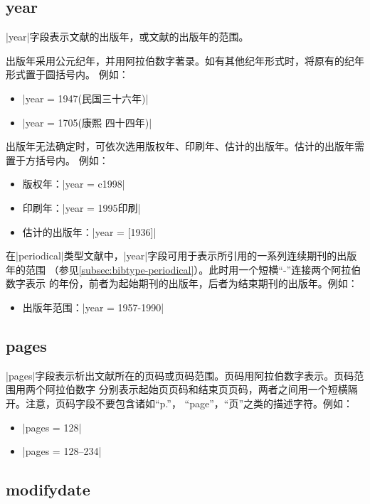 \subsection{year}\label{subsec:bibfield-year}

|year|字段表示文献的出版年，或文献的出版年的范围。

出版年采用公元纪年，并用阿拉伯数字著录。如有其他纪年形式时，将原有的纪年形式置于圆括号内。
例如：
\begin{itemize}
\item |year = {1947(民国三十六年)}|
\item |year = {1705(康熙 四十四年)}|
\end{itemize}

出版年无法确定时，可依次选用版权年、印刷年、估计的出版年。估计的出版年需置于方括号内。
例如：
\begin{itemize}
\item 版权年：|year = {c1998}|
\item 印刷年：|year = 1995印刷|
\item 估计的出版年：|year = {[1936]}|
\end{itemize}

在|periodical|类型文献中，|year|字段可用于表示所引用的一系列连续期刊的出版年的范围
（参见\ref{subsec:bibtype-periodical}）。此时用一个短横``-''连接两个阿拉伯数字表示
的年份，前者为起始期刊的出版年，后者为结束期刊的出版年。例如：
\begin{itemize}
\item 出版年范围：|year = {1957-1990}|
\end{itemize}


\subsection{pages}\label{subsec:bibfield-pages}

|pages|字段表示析出文献所在的页码或页码范围。页码用阿拉伯数字表示。页码范围用两个阿拉伯数字
分别表示起始页页码和结束页页码，两者之间用一个短横隔开。注意，页码字段不要包含诸如``p.''，
``page''，``页''之类的描述字符。例如：
\begin{itemize}
\item |pages = {128}|
\item |pages = {128--234}|
\end{itemize}

\subsection{modifydate}\label{subsec:bibfield-modifydate}

